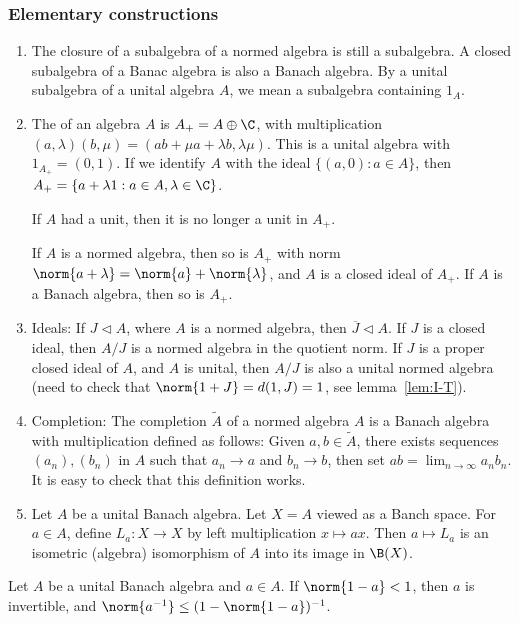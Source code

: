 \documentclass[a4paper]{article}
\begin{document}
\subsubsection*{Elementary constructions}
\begin{enumerate}[label=(\arabic*)]
	\item The closure of a subalgebra of a normed algebra is still a subalgebra. A closed subalgebra of a Banac algebra is also a Banach algebra. By a unital subalgebra of a unital algebra $A$, we mean a subalgebra containing $1_A$.
	\item The  of an algebra $A$ is $A_+=A\oplus\C$, with multiplication $(a,\lambda)(b,\mu)=(ab+\mu a+\lambda b,\lambda\mu)$. This is a unital algebra with $1_{A_+}=(0,1)$. If we identify $A$ with the ideal $\{(a,0):a\in A\}$, then $A_+=\{a+\lambda 1:a\in A,\lambda\in\C\}$.

	If $A$ had a unit, then it is no longer a unit in $A_+$.

	If $A$ is a normed algebra, then so is $A_+$ with norm $\norm{a+\lambda}=\norm{a}+\norm{\lambda}$, and $A$ is a closed ideal of $A_+$. If $A$ is a Banach algebra, then so is $A_+$.
	\item Ideals: If $J\triangleleft A$, where $A$ is a normed algebra, then $\overline{J}\triangleleft A$. If $J$ is a closed ideal, then $A/J$ is a normed algebra in the quotient norm. If $J$ is a proper closed ideal of $A$, and $A$ is unital, then $A/J$ is also a unital normed algebra (need to check that $\norm{1+J}=d(1,J)=1$, see lemma~\ref{lem:I-T}).
	\item Completion: The completion $\widetilde{A}$ of a normed algebra $A$ is a Banach algebra with multiplication defined as follows: Given $a,b\in\tilde{A}$, there exists sequences $(a_n),(b_n)$ in $A$ such that $a_n\to a$ and $b_n\to b$, then set $ab=\lim_{n\to\infty}a_nb_n$. It is easy to check that this definition works.
	\item Let $A$ be a unital Banach algebra. Let $X=A$ viewed as a Banch space. For $a\in A$, define $L_a:X\to X$ by left multiplication $x\mapsto ax$. Then $a\mapsto L_a$ is an isometric (algebra) isomorphism of $A$ into its image in $\B(X)$.
\end{enumerate}

\begin{nlemma}\label{lem:I-T}
  Let $A$ be a unital Banach algebra and $a\in A$. If $\norm{1-a}<1$, then $a$ is invertible, and $\norm{a^{-1}}\leq(1-\norm{1-a})^{-1}$.
\end{nlemma}
\end{document}
